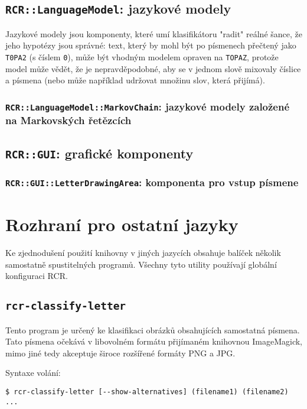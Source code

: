 \documentclass[a4paper]{article}
\begin{document}

\subsection{\texttt{RCR::LanguageModel}: jazykové modely}
Jazykové modely jsou komponenty, které umí klasifikátoru "radit"
reálné šance, že jeho hypotézy jsou správné: text,
který by mohl být po písmenech přečtený jako \texttt{T0PA2} (s číslem
\texttt{0}), může být vhodným modelem opraven na \texttt{TOPAZ}, protože
model může vědět, že je nepravděpodobné, aby se v jednom slově mixovaly
číslice a písmena (nebo může například udržovat množinu slov, která
přijímá).


\subsubsection{\texttt{RCR::LanguageModel::MarkovChain}: jazykové modely
založené na Markovských řetězcích}

\subsection{\texttt{RCR::GUI}: grafické komponenty}
\subsubsection{\texttt{RCR::GUI::LetterDrawingArea}: komponenta pro vstup
písmene}

\section{Rozhraní pro ostatní jazyky}
Ke zjednodušení použití knihovny v jiných jazycích obsahuje balíček několik
samostatně spustitelných programů. Všechny tyto utility používají globální
konfiguraci RCR.

\subsection{\texttt{rcr-classify-letter}}
Tento program je určený ke klasifikaci obrázků obsahujících samostatná písmena.
Tato písmena očekává v libovolném formátu přijímaném knihovnou ImageMagick,
mimo jiné tedy akceptuje široce rozšířené formáty PNG a JPG.

Syntaxe volání:
\begin{lstlisting}
$ rcr-classify-letter [--show-alternatives] (filename1) (filename2) ...
\end{lstlisting}
\end{document}
